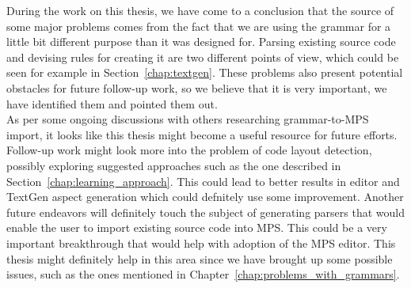 During the work on this thesis, we have come to a conclusion that the source of some major problems comes from the fact that we are using the grammar for a little bit different purpose than it was designed for.
Parsing existing source code and devising rules for creating it are two different points of view, which could be seen for example in Section~\ref{chap:textgen}.
These problems also present potential obstacles for future follow-up work, so we believe that it is very important, we have identified them and pointed them out.
\\

As per some ongoing discussions with others researching grammar-to-MPS import, it looks like this thesis might become a useful resource for future efforts.
Follow-up work might look more into the problem of code layout detection, possibly exploring suggested approaches such as the one described in Section~\ref{chap:learning_approach}.
This could lead to better results in editor and TextGen aspect generation which could defnitely use some improvement.
Another future endeavors will definitely touch the subject of generating parsers that would enable the user to import existing source code into MPS.
This could be a very important breakthrough that would help with adoption of the MPS editor.
This thesis might definitely help in this area since we have brought up some possible issues, such as the ones mentioned in Chapter~\ref{chap:problems_with_grammars}.
